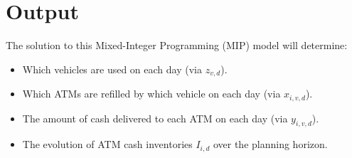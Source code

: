 \documentclass[11pt]{article}
\begin{document}
\section*{Output}
The solution to this Mixed-Integer Programming (MIP) model will determine:
\begin{itemize}[leftmargin=1.5cm]
    \item Which vehicles are used on each day (via \(z_{v,d}\)).
    \item Which ATMs are refilled by which vehicle on each day (via \(x_{i,v,d}\)).
    \item The amount of cash delivered to each ATM on each day (via \(y_{i,v,d}\)).
    \item The evolution of ATM cash inventories \(I_{i,d}\) over the planning horizon.
\end{itemize}
\end{document}
